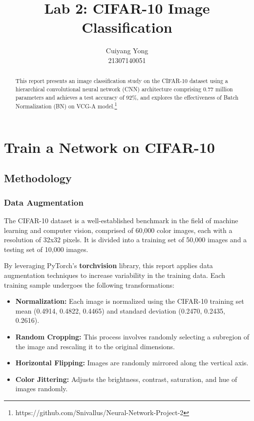 \documentclass{article}
\title{Lab 2: CIFAR-10 Image Classification}
\author{
Cuiyang Yong\\
21307140051
}
\begin{document}
\maketitle

\begin{abstract}
This report presents an image classification study on the CIFAR-10 dataset using a hierarchical convolutional neural network (CNN) architecture comprising 0.77 million parameters and achieves a test accuracy of 92\%, and explores the effectiveness of Batch Normalization (BN) on VCG-A model.\footnote{https://github.com/Snivallus/Neural-Network-Project-2}
\end{abstract}

\section{Train a Network on CIFAR-10}

\subsection{Methodology}

\subsubsection{Data Augmentation}
The CIFAR-10 dataset is a well-established benchmark in the field of machine learning and computer vision, comprised of 60,000 color images, each with a resolution of 32x32 pixels. It is divided into a training set of 50,000 images and a testing set of 10,000 images.

By leveraging PyTorch’s \textbf{torchvision} library, this report applies data augmentation techniques to increase variability in the training data. Each training sample undergoes the following transformations:

\begin{itemize}

    \item \textbf{Normalization:} Each image is normalized using the CIFAR-10 training set mean (0.4914, 0.4822, 0.4465) and standard deviation (0.2470, 0.2435, 0.2616).

    \item \textbf{Random Cropping:} This process involves randomly selecting a subregion of the image and rescaling it to the original dimensions.

    \item \textbf{Horizontal Flipping:} Images are randomly mirrored along the vertical axis.

    \item \textbf{Color Jittering:} Adjusts the brightness, contrast, saturation, and hue of images randomly.
    
\end{itemize}
\end{document}
